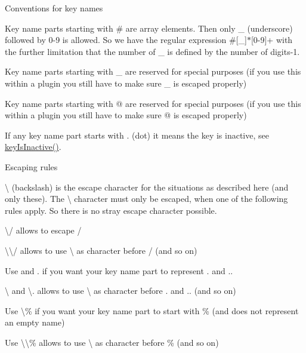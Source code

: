 \begin{DoxyParagraph}{Conventions for key names}

\begin{DoxyItemize}
\item Key name parts starting with \# are array elements. Then only \-\_\- (underscore) followed by 0-\/9 is allowed. So we have the regular expression \#\mbox{[}\-\_\-\mbox{]}$\ast$\mbox{[}0-\/9\mbox{]}+ with the further limitation that the number of \-\_\- is defined by the number of digits-\/1.
\item Key name parts starting with \-\_\- are reserved for special purposes (if you use this within a plugin you still have to make sure \-\_\- is escaped properly)
\item Key name parts starting with @ are reserved for special purposes (if you use this within a plugin you still have to make sure @ is escaped properly)
\item If any key name part starts with . (dot) it means the key is inactive, see \hyperlink{group__keytest_gaa25f699f592031c1a0abc1504d14e13e}{key\-Is\-Inactive()}.
\end{DoxyItemize}
\end{DoxyParagraph}
\begin{DoxyParagraph}{Escaping rules}

\begin{DoxyItemize}
\item \textbackslash{} (backslash) is the escape character for the situations as described here (and only these). The \textbackslash{} character must only be escaped, when one of the following rules apply. So there is no stray escape character possible.
\item \textbackslash{}/ allows to escape /
\item \textbackslash{}\textbackslash{}/ allows to use \textbackslash{} as character before / (and so on)
\item Use  and . if you want your key name part to represent . and ..
\item \textbackslash{} and \textbackslash{}. allows to use \textbackslash{} as character before . and .. (and so on)
\item Use \textbackslash{}\% if you want your key name part to start with \% (and does not represent an empty name)
\item Use \textbackslash{}\textbackslash{}\% allows to use \textbackslash{} as character before \% (and so on)
\end{DoxyItemize}
\end{DoxyParagraph}
